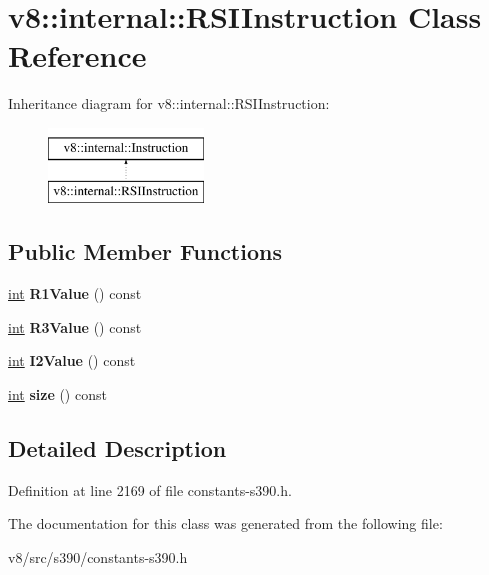\hypertarget{classv8_1_1internal_1_1RSIInstruction}{}\section{v8\+:\+:internal\+:\+:R\+S\+I\+Instruction Class Reference}
\label{classv8_1_1internal_1_1RSIInstruction}
Inheritance diagram for v8\+:\+:internal\+:\+:R\+S\+I\+Instruction\+:\begin{figure}[H]
\begin{center}
\leavevmode
\includegraphics[height=2.000000cm]{classv8_1_1internal_1_1RSIInstruction}
\end{center}
\end{figure}
\subsection*{Public Member Functions}
\begin{DoxyCompactItemize}
\item 
\mbox{\label{classv8_1_1internal_1_1RSIInstruction_a0e5343edc21d90f6d7c58f8413373ffe}} 
\mbox{\hyperlink{classint}{int}} {\bfseries R1\+Value} () const
\item 
\mbox{\label{classv8_1_1internal_1_1RSIInstruction_ac9bb7c9b1db13a086a1ed9904720b2c4}} 
\mbox{\hyperlink{classint}{int}} {\bfseries R3\+Value} () const
\item 
\mbox{\label{classv8_1_1internal_1_1RSIInstruction_a168a7c5732deda664ffd067d0448cdcd}} 
\mbox{\hyperlink{classint}{int}} {\bfseries I2\+Value} () const
\item 
\mbox{\label{classv8_1_1internal_1_1RSIInstruction_a2d5ac0a7f0f7555b846825427845ba0d}} 
\mbox{\hyperlink{classint}{int}} {\bfseries size} () const
\end{DoxyCompactItemize}


\subsection{Detailed Description}


Definition at line 2169 of file constants-\/s390.\+h.



The documentation for this class was generated from the following file\+:\begin{DoxyCompactItemize}
\item 
v8/src/s390/constants-\/s390.\+h\end{DoxyCompactItemize}
